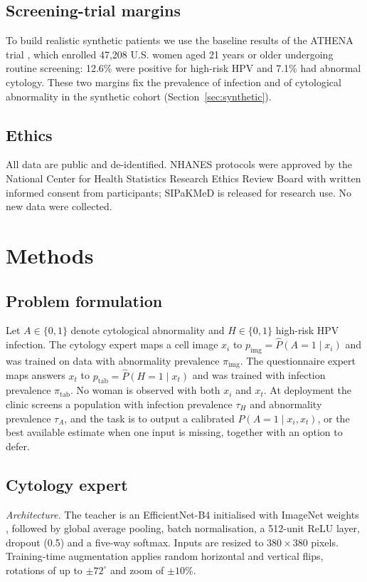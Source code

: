 \documentclass[lettersize,journal]{IEEEtran}
\newcommand{\pimg}{p_{\mathrm{img}}}
\newcommand{\ptab}{p_{\mathrm{tab}}}
\newcommand{\piimg}{\pi_{\mathrm{img}}}
\newcommand{\pitab}{\pi_{\mathrm{tab}}}
\begin{document}
\subsection{Screening-trial margins}
To build realistic synthetic patients we use the baseline results of the ATHENA trial \cite{wright2012athena}, which enrolled 47,208 U.S. women aged 21 years or older undergoing routine screening: 12.6\% were positive for high-risk HPV and 7.1\% had abnormal cytology. These two margins fix the prevalence of infection and of cytological abnormality in the synthetic cohort (Section~\ref{sec:synthetic}).

\subsection{Ethics}
All data are public and de-identified. NHANES protocols were approved by the National Center for Health Statistics Research Ethics Review Board with written informed consent from participants; SIPaKMeD is released for research use. No new data were collected.

\section{Methods}

\subsection{Problem formulation}
Let $A\in\{0,1\}$ denote cytological abnormality and $H\in\{0,1\}$ high-risk HPV infection. The cytology expert maps a cell image $x_i$ to $\pimg=\hat P(A{=}1\mid x_i)$ and was trained on data with abnormality prevalence $\piimg$. The questionnaire expert maps answers $x_t$ to $\ptab=\hat P(H{=}1\mid x_t)$ and was trained with infection prevalence $\pitab$. No woman is observed with both $x_i$ and $x_t$. At deployment the clinic screens a population with infection prevalence $\tau_H$ and abnormality prevalence $\tau_A$, and the task is to output a calibrated $P(A{=}1\mid x_i,x_t)$, or the best available estimate when one input is missing, together with an option to defer.

\subsection{Cytology expert}
\label{sec:image}
\emph{Architecture.} The teacher is an EfficientNet-B4 \cite{tan2019efficientnet} initialised with ImageNet weights \cite{deng2009imagenet}, followed by global average pooling, batch normalisation, a 512-unit ReLU layer, dropout (0.5) and a five-way softmax. Inputs are resized to $380\times380$ pixels. Training-time augmentation applies random horizontal and vertical flips, rotations of up to $\pm72^\circ$ and zoom of $\pm10\%$.
\end{document}
